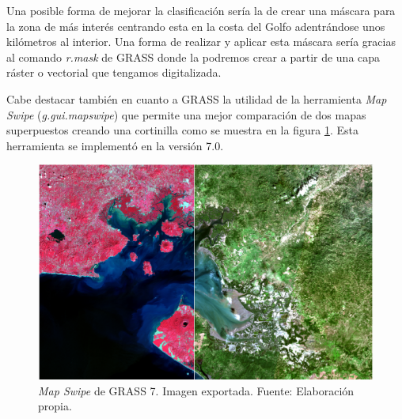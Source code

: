 Una posible forma de mejorar la clasificación sería la de crear una máscara para la zona de más interés centrando esta en la costa del Golfo adentrándose unos kilómetros al interior. Una forma de realizar y aplicar esta máscara sería gracias al comando \textit{r.mask} de GRASS donde la podremos crear a partir de una capa ráster o vectorial que tengamos digitalizada.\Sep

Cabe destacar también en cuanto a GRASS la utilidad de la herramienta \textit{Map Swipe} (\textit{g.gui.mapswipe}) que permite una mejor comparación de dos mapas superpuestos creando una cortinilla como se muestra en la figura \ref{fig:map_swipe}. Esta herramienta se implementó en la versión 7.0.

\begin{figure}
	\centering
	\includegraphics[width=0.9\linewidth]{./Imagenes/Map_swipe.eps}
	\caption[\textit{Map Swipe} de GRASS 7]{\textit{Map Swipe} de GRASS 7. Imagen exportada. Fuente: Elaboración propia.}
	\label{fig:map_swipe}
\end{figure}